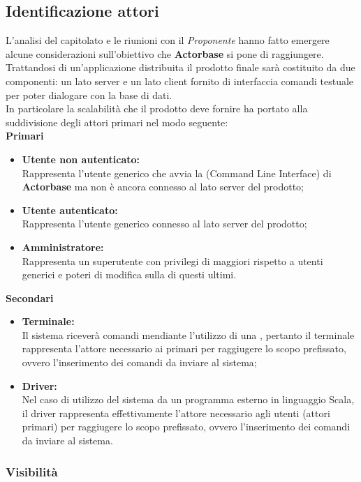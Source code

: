 \documentclass{scalatekids-article}
\begin{document}
\subsection{Identificazione attori}

L'analisi del capitolato e le riunioni con il \textit{Proponente} hanno fatto emergere
alcune considerazioni sull'obiettivo che \textbf{Actorbase} si pone di raggiungere.
Trattandosi di un'applicazione distribuita il prodotto finale sarà costituito
da due  componenti: un lato server e un lato client fornito di interfaccia
comandi testuale per poter dialogare con la base di dati.\\ In particolare la
scalabilità che il prodotto deve fornire ha portato alla suddivisione degli
attori primari nel modo seguente:\\
\textbf{Primari}
\begin{itemize}
\item\textbf{Utente non autenticato:}\\
  Rappresenta l'utente generico che avvia la  (Command Line Interface) di \textbf{Actorbase} ma non è ancora connesso al lato server del prodotto;
\item\textbf{Utente autenticato:}\\
  Rappresenta l'utente generico connesso al lato server del prodotto;
\item\textbf{Amministratore:}\\
  Rappresenta un superutente con privilegi di  maggiori rispetto a utenti generici e poteri di modifica sulla  di questi ultimi.
\end{itemize}
\textbf{Secondari}
\begin{itemize}
\item\textbf{Terminale:}\\
  Il sistema riceverà comandi mendiante l'utilizzo di una , pertanto il terminale rappresenta l'attore necessario ai primari per raggiugere lo scopo prefissato, ovvero
  l'inserimento dei comandi da inviare al sistema;
\item\textbf{Driver:}\\
  Nel caso di utilizzo del sistema da un programma esterno in linguaggio Scala, il driver rappresenta effettivamente l'attore necessario agli utenti (attori primari) per raggiugere
  lo scopo prefissato, ovvero l'inserimento dei comandi da inviare al sistema.
\end{itemize}

\subsubsection{Visibilità}
\end{document}
